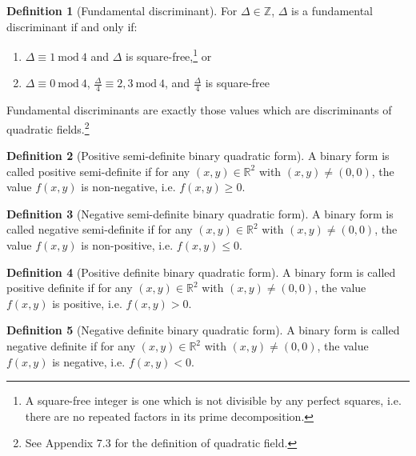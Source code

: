 \documentclass{article}
\theoremstyle{definition}
\newtheorem{definition}{Definition}[section]
\theoremstyle{theorem}
\theoremstyle{example}
\theoremstyle{corollary}
\begin{document}
\bigskip

\theoremstyle{definition}
\begin{definition}[Fundamental discriminant]
For \(\Delta \in \mathbb{Z}\), \(\Delta\) is a fundamental discriminant if and only if:
\begin{enumerate}
\item \(\Delta \equiv 1 \ \textrm{mod} \ 4\) and \(\Delta\) is square-free,\footnote{A square-free integer is one which is not divisible by any perfect squares, i.e. there are no repeated factors in its prime decomposition.} or
\item \(\Delta \equiv 0 \ \textrm{mod} \ 4\), \(\frac{\Delta}{4} \equiv 2, 3 \ \textrm{mod} \ 4\), and \(\frac{\Delta}{4}\) is square-free
\end{enumerate}
\end{definition}

\bigskip

Fundamental discriminants are exactly those values which are discriminants of quadratic fields.\footnote{See Appendix 7.3 for the definition of quadratic field.}

\bigskip

\theoremstyle{definition}
\begin{definition}[Positive semi-definite binary quadratic form]
A binary form is called positive semi-definite if for any \((x, y) \in \mathbb{R}^{2}\) with \((x, y) \ne (0, 0)\), the value \(f(x, y)\) is non-negative, i.e. \(f(x, y) \ge 0\).
\end{definition}

\bigskip

\theoremstyle{definition}
\begin{definition}[Negative semi-definite binary quadratic form]
A binary form is called negative semi-definite if for any \((x, y) \in \mathbb{R}^{2}\) with \((x, y) \ne (0, 0)\), the value \(f(x, y)\) is non-positive, i.e. \(f(x, y) \le 0\).
\end{definition}

\bigskip 

\theoremstyle{definition}
\begin{definition}[Positive definite binary quadratic form]
A binary form is called positive definite if for any \((x, y) \in \mathbb{R}^{2}\) with \((x, y) \ne (0, 0)\), the value \(f(x, y)\) is positive, i.e. \(f(x, y) > 0\).
\end{definition}

\bigskip

\theoremstyle{definition}
\begin{definition}[Negative definite binary quadratic form]
A binary form is called negative definite if for any \((x, y) \in \mathbb{R}^{2}\) with \((x, y) \ne (0, 0)\), the value \(f(x, y)\) is negative, i.e. \(f(x, y) < 0\).
\end{definition}
\end{document}
